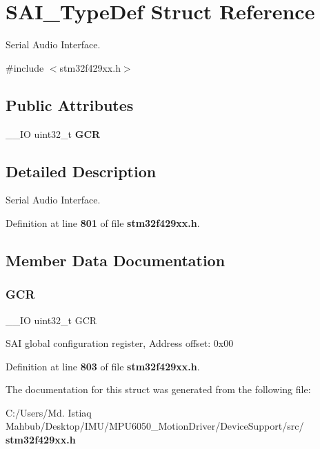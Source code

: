 \section{S\+A\+I\+\_\+\+Type\+Def Struct Reference}
\label{structSAI__TypeDef}


Serial Audio Interface.  




{\ttfamily \#include $<$stm32f429xx.\+h$>$}

\subsection*{Public Attributes}
\begin{DoxyCompactItemize}
\item 
\+\_\+\+\_\+\+IO uint32\+\_\+t \textbf{ G\+CR}
\end{DoxyCompactItemize}


\subsection{Detailed Description}
Serial Audio Interface. 

Definition at line \textbf{ 801} of file \textbf{ stm32f429xx.\+h}.



\subsection{Member Data Documentation}
\mbox{\label{structSAI__TypeDef_aae092d9d07574afe1fbc79c8bf7f7c19}} 
\subsubsection{G\+CR}
{\footnotesize\ttfamily \+\_\+\+\_\+\+IO uint32\+\_\+t G\+CR}

S\+AI global configuration register, Address offset\+: 0x00 

Definition at line \textbf{ 803} of file \textbf{ stm32f429xx.\+h}.



The documentation for this struct was generated from the following file\+:\begin{DoxyCompactItemize}
\item 
C\+:/\+Users/\+Md. Istiaq Mahbub/\+Desktop/\+I\+M\+U/\+M\+P\+U6050\+\_\+\+Motion\+Driver/\+Device\+Support/src/\textbf{ stm32f429xx.\+h}\end{DoxyCompactItemize}
